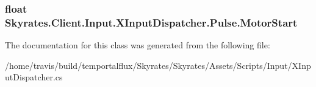 \hypertarget{class_skyrates_1_1_client_1_1_input_1_1_x_input_dispatcher_1_1_pulse_a5f9b43b20bf6a10c7433e3f995504704}{
\subsubsection[{Motor\-Start}]{\setlength{\rightskip}{0pt plus 5cm}float Skyrates.\-Client.\-Input.\-X\-Input\-Dispatcher.\-Pulse.\-Motor\-Start}}\label{class_skyrates_1_1_client_1_1_input_1_1_x_input_dispatcher_1_1_pulse_a5f9b43b20bf6a10c7433e3f995504704}






The documentation for this class was generated from the following file\-:\begin{DoxyCompactItemize}
\item 
/home/travis/build/temportalflux/\-Skyrates/\-Skyrates/\-Assets/\-Scripts/\-Input/X\-Input\-Dispatcher.\-cs\end{DoxyCompactItemize}
